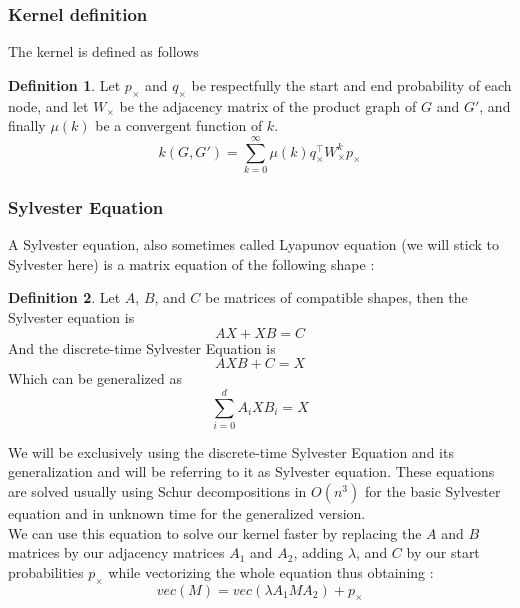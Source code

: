 \documentclass{article}
\theoremstyle{definition}
\newtheorem{definition}{Definition}
\begin{document}
\subsubsection{Kernel definition}
The kernel is defined as follows
\begin{definition}Let $p_{\times}$ and $q_{\times}$ be respectfully the start and end probability of each node, and let $W_{\times}$ be the adjacency matrix of the product graph of $G$ and $G'$, and finally $\mu(k)$ be a convergent function of $k$.
	\begin{equation}
		k(G,G') = \sum\limits_{k=0}^{\infty}\mu(k)q_{\times}^{\top}W_{\times}^{k}p_{\times}
	\end{equation}
\end{definition}

\subsubsection{Sylvester Equation}
A Sylvester equation, also sometimes called Lyapunov equation (we will stick to Sylvester here) is a matrix equation of the following shape :
\begin{definition}
	Let $A$, $B$, and $C$ be matrices of compatible shapes, then the Sylvester equation is
	\begin{equation}
	AX+XB=C
	\end{equation}
	And the discrete-time Sylvester Equation is 
	\begin{equation}
	AXB+C=X
	\end{equation}
	Which can be generalized as
	\begin{equation}
		\sum_{i=0}^{d}A_{i}XB_{i}=X
	\end{equation}
\end{definition}
We will be exclusively using the discrete-time Sylvester Equation and its generalization and will be referring to it as Sylvester equation. These equations are solved usually using Schur decompositions in $O(n^3)$ for the basic Sylvester equation and in unknown time for the generalized version\cite{vishwanathan_graph_2010}.\\
We can use this equation to solve our kernel faster by replacing the $A$ and $B$ matrices by our adjacency matrices $A_1$ and $A_2$, adding $\lambda$, and $C$ by our start probabilities $p_\times$ while vectorizing the whole equation thus obtaining :
\begin{equation}
	vec(M) = vec(\lambda A_{1}MA_{2}) + p_{\times}
\end{equation}
\end{document}
